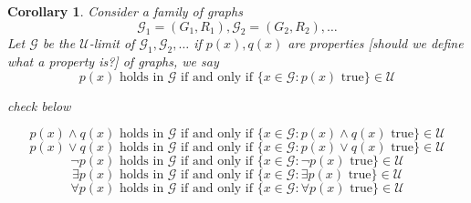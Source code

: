 \documentclass{maatext}
\newtheorem{corollary}[theorem]{Corollary}
\theoremstyle{definition}
\theoremstyle{remark}
\numberwithin{section}{chapter}
\numberwithin{equation}{chapter}
\begin{document}
\begin{corollary}
Consider a family of graphs
$$\mathscr{G}_1 = (G_1, R_1), \mathscr{G}_2 = (G_2, R_2), \dots$$
Let $\mathscr{G}$ be the $\mathscr{U}$-limit of $\mathscr{G}_1, \mathscr{G}_2, \dots$ if $p(x), q(x)$ are properties {\color{red} [should we define what a property is?]} of graphs, we say 
$$p(x) \text{ holds in } \mathscr{G} \text{ if and only if } \{ x \in \mathscr{G} : p(x) \text{ true} \}\in \mathscr{U}$$

\begin{center} \color{red} check below \end{center}

$$p(x) \wedge q(x) \text{ holds in } \mathscr{G} \text{ if and only if } \{ x \in \mathscr{G} : p(x) \wedge q(x) \text{ true} \}\in \mathscr{U}$$
$$p(x) \vee q(x) \text{ holds in } \mathscr{G} \text{ if and only if } \{ x \in \mathscr{G} : p(x) \vee q(x) \text{ true} \}\in \mathscr{U}$$
$$\neg p(x) \text{ holds in } \mathscr{G} \text{ if and only if } \{ x \in \mathscr{G} : \neg p(x) \text{ true} \}\in \mathscr{U}$$
$$\exists p(x) \text{ holds in } \mathscr{G} \text{ if and only if } \{ x \in \mathscr{G} : \exists p(x) \text{ true} \}\in \mathscr{U}$$
$$\forall p(x) \text{ holds in } \mathscr{G} \text{ if and only if } \{ x \in \mathscr{G} : \forall p(x) \text{ true} \}\in \mathscr{U}$$
\end{corollary}
\end{document}
